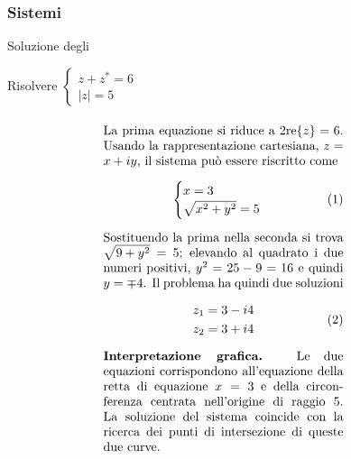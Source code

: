 \documentclass[letterpaper,10pt,italian]{jupyterBook}
\begin{document}
\subsubsection{Sistemi}
\label{\detokenize{ch/algebra/complex-algebra-sol:sistemi}}
\sphinxAtStartPar
Soluzione degli {\hyperref[\detokenize{ch/algebra/complex-algebra-problems:math-hs-algebra-complex-problems-equations-sys}]{}}

\sphinxAtStartPar
{} Risolvere \(\begin{cases} z + z^* = 6 \\ |z| = 5 \end{cases}\)
\begin{equation*}
\begin{split}
\begin{minipage}[t]{.55\textwidth}
  \vspace{0pt}
La prima equazione si riduce a $2 \text{re}\{z\} = 6$. Usando la rappresentazione cartesiana, $z = x + i y$, il sistema può essere riscritto come
%
\begin{equation}\begin{cases}
  x = 3 \\
  \sqrt{x^2 +y^2} = 5
\end{cases}\end{equation}
%
Sostituendo la prima nella seconda si trova $\sqrt{9 + y^2} = 5$; elevando al quadrato i due numeri positivi, $y^2 = 25-9=16$ e quindi $y = \mp 4$. Il problema ha quindi due soluzioni
%
\begin{equation}\begin{aligned}
  z_1 & = 3 - i 4 \\
  z_2 & = 3 + i 4
\end{aligned}\end{equation}
%
\textbf{Interpretazione grafica.} Le due equazioni corrispondono all'equazione della retta di equazione $x = 3$ e della circonferenza centrata nell'origine di raggio $5$. La soluzione del sistema coincide con la ricerca dei punti di intersezione di queste due curve.
%
\end{minipage}
\hspace{.05\textwidth} %
\begin{minipage}[t]{.40\textwidth}
  \vspace{0pt}

\end{minipage}
\end{split}
\end{equation*}
\end{document}
